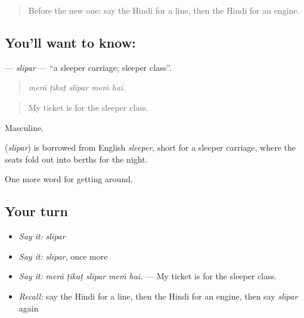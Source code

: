 \label{lesson:HI-C399-slipar}



\begin{quote}
Before the new one: say the Hindi for a line, then the Hindi for an engine.
\end{quote}

\subsection*{You'll want to know: }
\textbf{} — \emph{slīpar} — \textquotedblleft{}a sleeper carriage; sleeper class\textquotedblright{}.

\begin{quote}
    
\end{quote}

\begin{quote}
\emph{merā ṭikaṭ slīpar meṁ hai.}
\end{quote}

\begin{quote}
My ticket is for the sleeper class.
\end{quote}

Masculine.

\begin{cousinweb}
\textbf{} (\emph{slīpar}) is borrowed from English \emph{sleeper}, short for a sleeper carriage, where the seats fold out into berths for the night.
\end{cousinweb}

\begin{grammarlens}[title={What you've built}]
One more word for getting around.
\end{grammarlens}

\subsection*{Your turn}
\begin{itemize}
\raggedright
  \item \emph{Say it:} \emph{slīpar}
  \item \emph{Say it:} \emph{slīpar}, once more
  \item \emph{Say it:} \emph{merā ṭikaṭ slīpar meṁ hai.} — My ticket is for the sleeper class.
  \item \emph{Recall:} say the Hindi for a line, then the Hindi for an engine, then say \emph{slīpar} again
\end{itemize}

